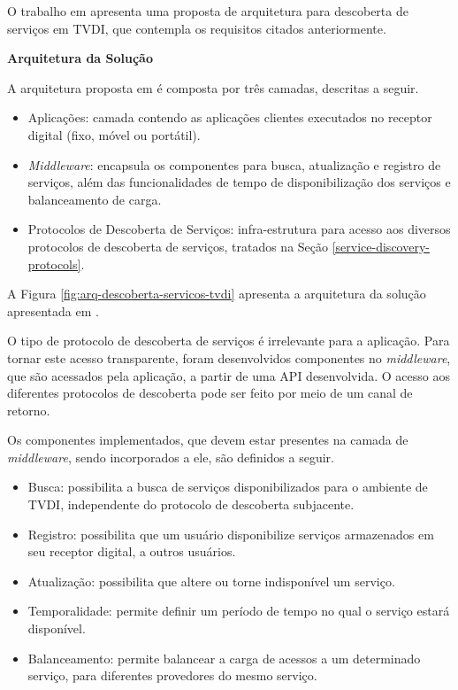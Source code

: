 O trabalho em \cite{borges2007arquitetura} apresenta uma proposta de arquitetura para descoberta de serviços em TVDI, que contempla os requisitos citados anteriormente.

\textbf{Arquitetura da Solução}

A arquitetura proposta em \cite{borges2007arquitetura} é composta por três camadas, descritas a seguir.

\begin{itemize}
	\item Aplicações: camada contendo as aplicações clientes executados no receptor digital (fixo, móvel ou portátil).
  \item \textit{Middleware}: encapsula os componentes para busca, atualização e registro de serviços, além das funcionalidades de tempo de disponibilização dos serviços e balanceamento de carga.
  \item Protocolos de Descoberta de Serviços: infra-estrutura para acesso aos diversos protocolos de descoberta de serviços, tratados na Seção \ref{service-discovery-protocols}.
\end{itemize}

A Figura \ref{fig:arq-descoberta-servicos-tvdi} apresenta a arquitetura da solução apresentada em \cite{borges2007arquitetura}.

O tipo de protocolo de descoberta de serviços é irrelevante para a aplicação. Para tornar este acesso transparente, foram desenvolvidos componentes no \textit{middleware}, que são acessados pela aplicação, a partir de uma API desenvolvida. O acesso aos diferentes protocolos de descoberta pode ser feito por meio de um canal de retorno.

Os componentes implementados, que devem estar presentes na camada de \textit{middleware}, sendo incorporados a ele, são definidos a seguir.

\begin{itemize}
	\item Busca: possibilita a busca de serviços disponibilizados para o ambiente de TVDI, independente do protocolo de descoberta subjacente.
  \item Registro: possibilita que um usuário disponibilize serviços armazenados em seu receptor digital, a outros usuários.
  \item Atualização: possibilita que altere ou torne indisponível um serviço.
  \item Temporalidade: permite definir um período de tempo no qual o serviço estará disponível.
  \item Balanceamento: permite balancear a carga de acessos a um determinado serviço, para diferentes provedores do mesmo serviço.
\end{itemize}

